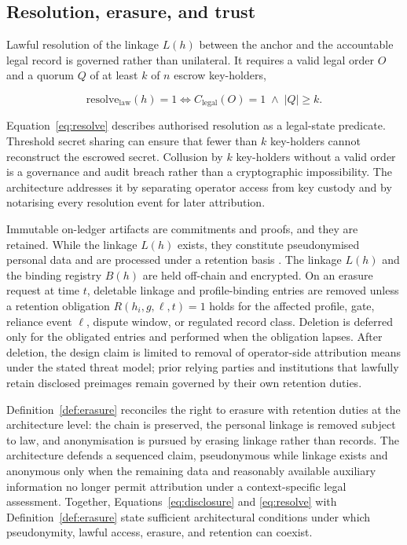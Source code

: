 \documentclass[oneside,10pt]{swissi}
\begin{document}
\subsection{Resolution, erasure, and trust}

Lawful resolution of the linkage $L(h)$ between the anchor and the accountable legal record is governed rather than unilateral. It requires a valid legal order $O$ and a quorum $Q$ of at least $k$ of $n$ escrow key-holders,

\begin{equation}
\label{eq:resolve}
\mathrm{resolve}_{\text{law}}(h) = 1 \iff C_{\text{legal}}(O) = 1 \;\wedge\; \lvert Q \rvert \ge k.
\end{equation}

Equation~\eqref{eq:resolve} describes authorised resolution as a legal-state predicate. Threshold secret sharing can ensure that fewer than $k$ key-holders cannot reconstruct the escrowed secret.\cite{shamir1979secret} Collusion by $k$ key-holders without a valid order is a governance and audit breach rather than a cryptographic impossibility. The architecture addresses it by separating operator access from key custody and by notarising every resolution event for later attribution.

\begin{definition}
\label{def:erasure}
Immutable on-ledger artifacts are commitments and proofs, and they are retained. While the linkage $L(h)$ exists, they constitute pseudonymised personal data and are processed under a retention basis \cite{gdpr2016, edpb2025}. The linkage $L(h)$ and the binding registry $B(h)$ are held off-chain and encrypted. On an erasure request at time $t$, deletable linkage and profile-binding entries are removed unless a retention obligation $R(h_i,g,\ell,t) = 1$ holds for the affected profile, gate, reliance event $\ell$, dispute window, or regulated record class. Deletion is deferred only for the obligated entries and performed when the obligation lapses. After deletion, the design claim is limited to removal of operator-side attribution means under the stated threat model; prior relying parties and institutions that lawfully retain disclosed preimages remain governed by their own retention duties.
\end{definition}

Definition~\ref{def:erasure} reconciles the right to erasure with retention duties at the architecture level: the chain is preserved, the personal linkage is removed subject to law, and anonymisation is pursued by erasing linkage rather than records. The architecture defends a sequenced claim, pseudonymous while linkage exists and anonymous only when the remaining data and reasonably available auxiliary information no longer permit attribution under a context-specific legal assessment. Together, Equations~\eqref{eq:disclosure} and \eqref{eq:resolve} with Definition~\ref{def:erasure} state sufficient architectural conditions under which pseudonymity, lawful access, erasure, and retention can coexist.
\end{document}
